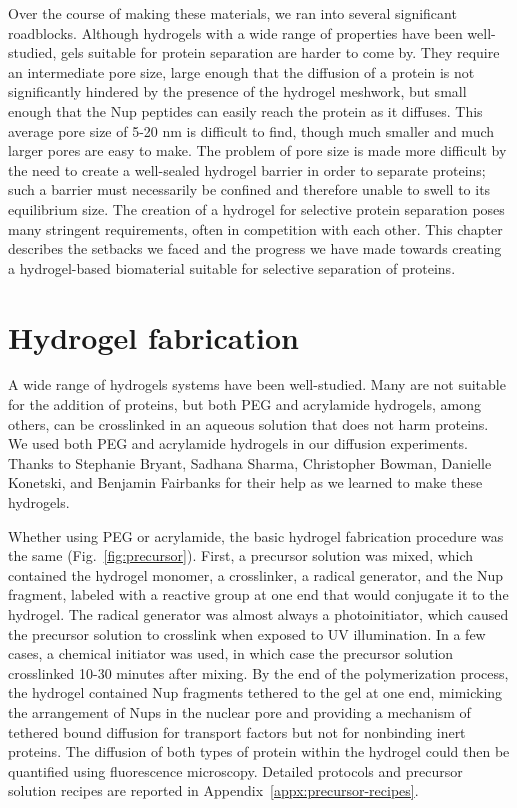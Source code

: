 Over the course of making these materials, we ran into several significant roadblocks.  Although hydrogels with a wide range of properties have been well-studied, gels suitable for protein separation are harder to come by.  They require an intermediate pore size, large enough that the diffusion of a protein is not significantly hindered by the presence of the hydrogel meshwork, but small enough that the Nup peptides can easily reach the protein as it diffuses.  This average pore size of 5-20 nm is difficult to find, though much smaller and much larger pores are easy to make.  The problem of pore size is made more difficult by the need to create a well-sealed hydrogel barrier in order to separate proteins; such a barrier must necessarily be confined and therefore unable to swell to its equilibrium size. The creation of a hydrogel for selective protein separation poses many stringent requirements, often in competition with each other.  This chapter describes the setbacks we faced and the progress we have made towards creating a hydrogel-based biomaterial suitable for selective separation of proteins.

\section{Hydrogel fabrication}
\label{sec:hydrogel-fabrication}

A wide range of hydrogels systems have been well-studied.  Many are not suitable for the addition of proteins, but both PEG and acrylamide hydrogels, among others, can be crosslinked in an aqueous solution that does not harm proteins.  We used both PEG and acrylamide hydrogels in our diffusion experiments.  Thanks to Stephanie Bryant, Sadhana Sharma, Christopher Bowman, Danielle Konetski, and Benjamin Fairbanks for their help as we learned to make these hydrogels.

Whether using PEG or acrylamide, the basic hydrogel fabrication procedure was the same (Fig.~\ref{fig:precursor}).  First, a precursor solution was mixed, which contained the hydrogel monomer, a crosslinker, a radical generator, and the Nup fragment, labeled with a reactive group at one end that would conjugate it to the hydrogel.  The radical generator was almost always a photoinitiator, which caused the precursor solution to crosslink when exposed to UV illumination.  In a few cases, a chemical initiator was used, in which case the precursor solution crosslinked 10-30 minutes after mixing.  By the end of the polymerization process, the hydrogel contained Nup fragments tethered to the gel at one end, mimicking the arrangement of Nups in the nuclear pore and providing a mechanism of tethered bound diffusion for transport factors but not for nonbinding inert proteins.  The diffusion of both types of protein within the hydrogel could then be quantified using fluorescence microscopy.  Detailed protocols and precursor solution recipes are reported in Appendix~\ref{appx:precursor-recipes}.

